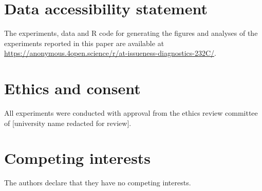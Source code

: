 \documentclass[times,linguex]{glossa}
\begin{document}
\pagebreak

\section*{Data accessibility statement}
The experiments, data and R code for generating the figures and analyses of the experiments reported in this paper are available at \url{https://anonymous.4open.science/r/at-issueness-diagnostics-232C/}.

\section*{Ethics and consent}
All experiments were conducted with approval from the ethics review committee of [university name redacted for review].




\section*{Competing interests}
  The authors declare that they have no competing interests.




\appendix

\setcounter{table}{0}
\renewcommand{\thetable}{A\arabic{table}}

\setcounter{figure}{0}
\renewcommand{\thefigure}{A\arabic{figure}}
\end{document}
